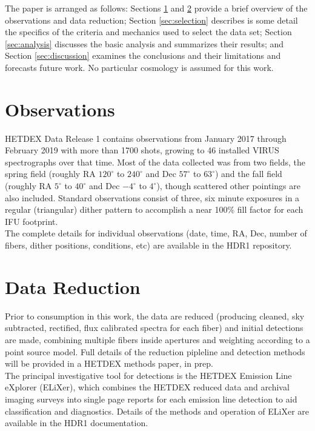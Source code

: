 \documentclass{aastex62}
\begin{document}
The paper is arranged as follows: Sections \ref{sec:obs} and \ref{sec:reduction} provide a brief overview of the observations and data reduction; Section \ref{sec:selection} describes is some detail the specifics of the criteria and mechanics used to select the data set; Section \ref{sec:analysis} discusses the basic analysis and summarizes their results; and Section \ref{sec:discussion} examines the conclusions and their limitations and forecasts future work. No particular cosmology is assumed for this work.\\



\section{Observations} \label{sec:obs}

HETDEX Data Release 1 contains observations from January 2017 through February 2019 with more than 1700 shots, growing to 46 installed VIRUS spectrographs over that time. Most of the data collected was from two fields, the spring field (roughly RA $120^{\circ}$ to $240^{\circ}$ and Dec $57^{\circ}$ to $63^{\circ}$) and the fall field (roughly RA $5^{\circ}$ to $40^{\circ}$ and Dec $-4^{\circ}$ to $4^{\circ}$), though scattered other pointings are also included. Standard observations consist of three, six minute exposures in a regular (triangular) dither pattern to accomplish a near 100\% fill factor for each IFU footprint. \\

The complete details for individual observations (date, time, RA, Dec, number of fibers, dither positions, conditions, etc) are available in the HDR1 repository.\\

\section{Data Reduction} \label{sec:reduction}

Prior to consumption in this work, the data are reduced (producing cleaned, sky subtracted, rectified, flux calibrated spectra for each fiber) and initial detections are made, combining multiple fibers inside apertures and weighting according to a point source model. Full details of the reduction pipleline and detection methods will be provided in a HETDEX methods paper, in prep.\\


The principal investigative tool for detections is the HETDEX Emission Line eXplorer (ELiXer), which combines the HETDEX reduced data and archival imaging surveys into single page reports for each emission line detection to aid classification and diagnostics. Details of the methods and operation of ELiXer are available in the HDR1 documentation.
\end{document}
